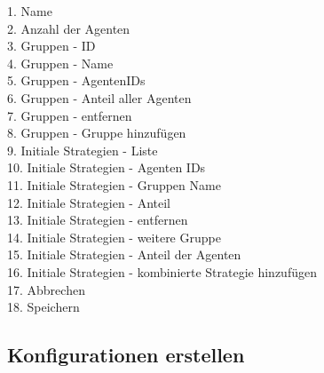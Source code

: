 \begin{description}

\item[1. Name] 

\item[2. Anzahl der Agenten] 

\item[3. Gruppen - ID] 

\item[4. Gruppen - Name] 

\item[5. Gruppen - AgentenIDs] 

\item[6. Gruppen - Anteil aller Agenten] 

\item[7. Gruppen - entfernen] 

\item[8. Gruppen - Gruppe hinzufügen] 

\item[9. Initiale Strategien - Liste] 

\item[10. Initiale Strategien - Agenten IDs] 

\item[11. Initiale Strategien - Gruppen Name] 

\item[12. Initiale Strategien - Anteil] 

\item[13. Initiale Strategien - entfernen] 

\item[14. Initiale Strategien - weitere Gruppe] 

\item[15. Initiale Strategien - Anteil der Agenten] 

\item[16. Initiale Strategien - kombinierte Strategie hinzufügen] 

\item[17. Abbrechen] 

\item[18. Speichern] 

\end{description}


\pagebreak

\subsection{Konfigurationen erstellen}

